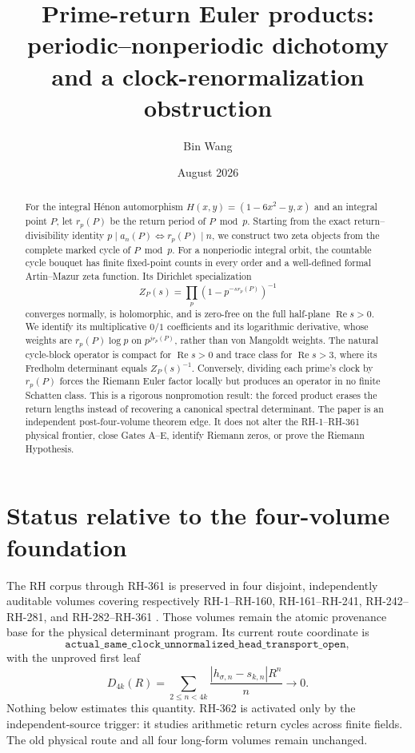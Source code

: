 \documentclass[11pt]{article}
\title{Prime-return Euler products:\\
periodic--nonperiodic dichotomy and a clock-renormalization obstruction}
\author{Bin Wang}
\date{August 2026}
\theoremstyle{remark}
\newcommand{\RePart}{\operatorname{Re}}
\begin{document}
\maketitle

\begin{abstract}
For the integral H\'enon automorphism
\(
H(x,y)=(1-6x^2-y,x)
\)
and an integral point \(P\), let \(r_p(P)\) be the return period of
\(P\bmod p\).
Starting from the exact return--divisibility identity
\(
p\mid a_n(P)\Longleftrightarrow r_p(P)\mid n
\),
we construct two zeta objects from the complete marked cycle of \(P\bmod p\).
For a nonperiodic integral orbit, the countable cycle bouquet has finite
fixed-point counts in every order and a well-defined formal Artin--Mazur zeta
function.  Its Dirichlet specialization
\[
 Z_P(s)=\prod_p(1-p^{-s r_p(P)})^{-1}
\]
converges normally, is holomorphic, and is zero-free on the full half-plane
\(\RePart s>0\).  We identify its multiplicative \(0/1\) coefficients and its
logarithmic derivative, whose weights are \(r_p(P)\log p\) on
\(p^{j r_p(P)}\), rather than von Mangoldt weights.  The natural cycle-block
operator is compact for \(\RePart s>0\) and trace class for \(\RePart s>3\),
where its Fredholm determinant equals \(Z_P(s)^{-1}\).  Conversely, dividing
each prime's clock by \(r_p(P)\) forces the Riemann Euler factor locally but
produces an operator in no finite Schatten class.  This is a rigorous
nonpromotion result: the forced product erases the return lengths instead of
recovering a canonical spectral determinant.  The paper is an independent
post-four-volume theorem edge.  It does not alter the RH-1--RH-361 physical
frontier, close Gates A--E, identify Riemann zeros, or prove the Riemann
Hypothesis.
\end{abstract}

\section{Status relative to the four-volume foundation}

The RH corpus through RH-361 is preserved in four disjoint, independently
auditable volumes covering respectively RH-1--RH-160, RH-161--RH-241,
RH-242--RH-281, and RH-282--RH-361 \citep{WangRHCorpus2026}.  Those volumes
remain the atomic provenance base for the physical determinant program.  Its
current route coordinate is
\[
 \texttt{actual\_same\_clock\_unnormalized\_head\_transport\_open},
\]
with the unproved first leaf
\[
 D_{4k}(R)=\sum_{2\le n<4k}
 \frac{|h_{\sigma,n}-s_{k,n}|R^n}{n}\longrightarrow0.
\]
Nothing below estimates this quantity.  RH-362 is activated only by the
independent-source trigger: it studies arithmetic return cycles across finite
fields.  The old physical route and all four long-form volumes remain
unchanged.
\end{document}
